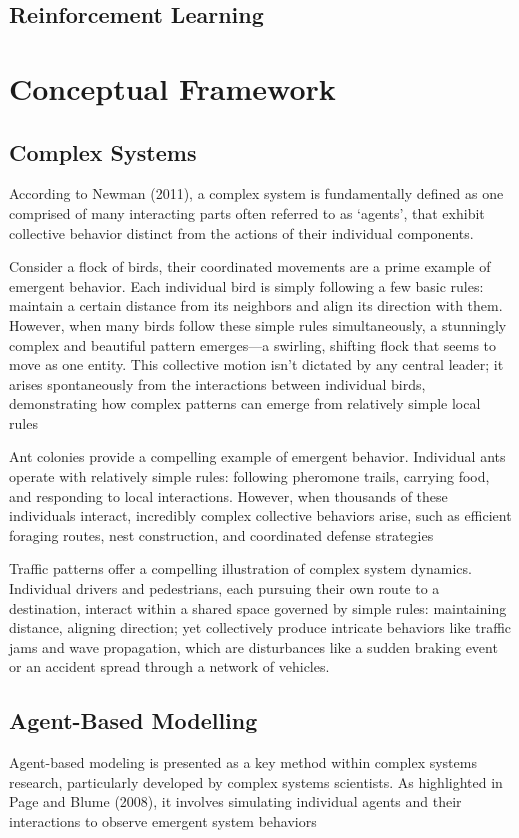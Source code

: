 \subsection{Reinforcement Learning}
\section{Conceptual Framework}
\subsection{Complex Systems}
According to Newman (2011), a complex system is fundamentally defined as one comprised of many interacting parts often referred to as ‘agents’, that exhibit collective behavior distinct from the actions of their individual components.

Consider a flock of birds, their coordinated movements are a prime example of emergent behavior. Each individual bird is simply following a few basic rules: maintain a certain distance from its neighbors and align its direction with them. However, when many birds follow these simple rules simultaneously, a stunningly complex and beautiful pattern emerges—a swirling, shifting flock that seems to move as one entity. This collective motion isn’t dictated by any central leader; it arises spontaneously from the interactions between individual birds, demonstrating how complex patterns can emerge from relatively simple local rules

Ant colonies provide a compelling example of emergent behavior. Individual ants operate with relatively simple rules: following pheromone trails, carrying food, and responding to local interactions. However, when thousands of these individuals interact, incredibly complex collective behaviors arise, such as efficient foraging routes, nest construction, and coordinated defense strategies

Traffic patterns offer a compelling illustration of complex system dynamics. Individual drivers and pedestrians, each pursuing their own route to a destination, interact within a shared space governed by simple rules: maintaining distance, aligning direction; yet collectively produce intricate behaviors like traffic jams and wave propagation, which are disturbances like a sudden braking event or an accident spread through a network of vehicles.

\subsection{Agent-Based Modelling}
Agent-based modeling is presented as a key method within complex systems research, particularly developed by complex systems scientists. As highlighted in Page and Blume (2008), it involves simulating individual agents and their interactions to observe emergent system behaviors

